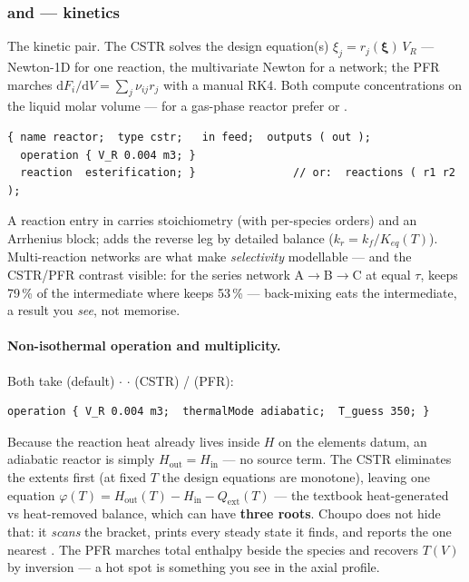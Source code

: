 \documentclass[11pt,a4paper]{article}
\begin{document}
\subsubsection{ and  --- kinetics}

The kinetic pair.  The CSTR solves the design equation(s)
$\xi_j = r_j(\boldsymbol{\xi})\,V_R$ --- Newton-1D for one reaction, the
multivariate Newton for a network; the PFR marches
$\mathrm{d}F_i/\mathrm{d}V = \sum_j \nu_{ij} r_j$ with a manual RK4.
Both compute concentrations on the liquid molar volume --- for a
gas-phase reactor prefer  or
.

\begin{lstlisting}[language=dict]
{ name reactor;  type cstr;   in feed;  outputs ( out );
  operation { V_R 0.004 m3; }
  reaction  esterification; }               // or:  reactions ( r1 r2 );
\end{lstlisting}

A reaction entry in  carries stoichiometry
(with per-species orders) and an Arrhenius  block;
 adds the reverse leg by detailed balance
($k_r = k_f / K_{eq}(T)$).  Multi-reaction networks are what make
\emph{selectivity} modellable --- and the CSTR/PFR contrast visible: for
the series network A$\to$B$\to$C at equal $\tau$,
 keeps 79\,\% of the intermediate
where  keeps 53\,\% --- back-mixing
eats the intermediate, a result you \emph{see}, not memorise.

\paragraph{Non-isothermal operation and multiplicity.}  Both take
 (default) $\cdot$  $\cdot$
 (CSTR) /
 (PFR):

\begin{lstlisting}[language=dict]
operation { V_R 0.004 m3;  thermalMode adiabatic;  T_guess 350; }
\end{lstlisting}

Because the reaction heat already lives inside $H$ on the elements
datum, an adiabatic reactor is simply $H_{\mathrm{out}} = H_{\mathrm{in}}$
--- no source term.  The CSTR eliminates the extents first (at fixed
$T$ the design equations are monotone), leaving one equation
$\varphi(T) = H_{\mathrm{out}}(T) - H_{\mathrm{in}} - Q_{\mathrm{ext}}(T)$
--- the textbook heat-generated vs heat-removed balance, which can have
\textbf{three roots}.  Choupo does not hide that: it \emph{scans} the
bracket, prints every steady state it finds, and reports the one
nearest .  The PFR marches total enthalpy beside the
species and recovers $T(V)$ by inversion --- a hot spot is something you
see in the axial profile.
\end{document}
